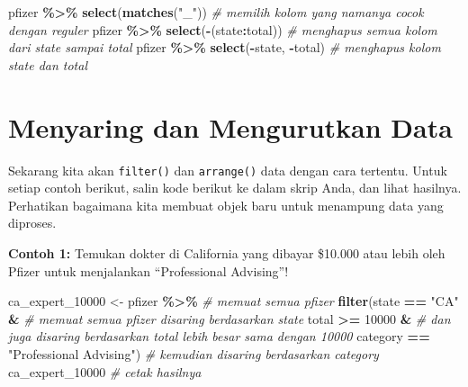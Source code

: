 \documentclass[
]{book}
\newenvironment{Shaded}{\begin{snugshade}}{\end{snugshade}}
\newcommand{\CommentTok}[1]{\textcolor[rgb]{0.56,0.35,0.01}{\textit{#1}}}
\newcommand{\DecValTok}[1]{\textcolor[rgb]{0.00,0.00,0.81}{#1}}
\newcommand{\FunctionTok}[1]{\textcolor[rgb]{0.13,0.29,0.53}{\textbf{#1}}}
\newcommand{\NormalTok}[1]{#1}
\newcommand{\OtherTok}[1]{\textcolor[rgb]{0.56,0.35,0.01}{#1}}
\newcommand{\SpecialCharTok}[1]{\textcolor[rgb]{0.81,0.36,0.00}{\textbf{#1}}}
\newcommand{\StringTok}[1]{\textcolor[rgb]{0.31,0.60,0.02}{#1}}
\begin{document}
\begin{Shaded}
\begin{Highlighting}[]
\NormalTok{pfizer }\SpecialCharTok{\%\textgreater{}\%} \FunctionTok{select}\NormalTok{(}\FunctionTok{matches}\NormalTok{(}\StringTok{"\_"}\NormalTok{))                   }\CommentTok{\# memilih kolom yang namanya cocok dengan reguler}
\NormalTok{pfizer }\SpecialCharTok{\%\textgreater{}\%} \FunctionTok{select}\NormalTok{(}\SpecialCharTok{{-}}\NormalTok{(state}\SpecialCharTok{:}\NormalTok{total))                 }\CommentTok{\# menghapus semua kolom dari \textasciigrave{}state\textasciigrave{} sampai \textasciigrave{}total\textasciigrave{}}
\NormalTok{pfizer }\SpecialCharTok{\%\textgreater{}\%} \FunctionTok{select}\NormalTok{(}\SpecialCharTok{{-}}\NormalTok{state, }\SpecialCharTok{{-}}\NormalTok{total)                 }\CommentTok{\# menghapus kolom \textasciigrave{}state\textasciigrave{} dan \textasciigrave{}total\textasciigrave{}}
\end{Highlighting}
\end{Shaded}

\hypertarget{menyaring-dan-mengurutkan-data}{%
\section{Menyaring dan Mengurutkan Data}\label{menyaring-dan-mengurutkan-data}}

Sekarang kita akan \texttt{filter()} dan \texttt{arrange()} data dengan cara tertentu. Untuk setiap contoh berikut, salin kode berikut ke dalam skrip Anda, dan lihat hasilnya. Perhatikan bagaimana kita membuat objek baru untuk menampung data yang diproses.

\textbf{Contoh 1:} Temukan dokter di California yang dibayar \$10.000 atau lebih oleh Pfizer untuk menjalankan ``Professional Advising''!

\begin{Shaded}
\begin{Highlighting}[]
\NormalTok{ca\_expert\_10000 }\OtherTok{\textless{}{-}}\NormalTok{ pfizer }\SpecialCharTok{\%\textgreater{}\%}                     \CommentTok{\# memuat semua \textasciigrave{}pfizer\textasciigrave{}    }
  \FunctionTok{filter}\NormalTok{(state }\SpecialCharTok{==} \StringTok{"CA"} \SpecialCharTok{\&}                          \CommentTok{\# memuat semua \textasciigrave{}pfizer\textasciigrave{} disaring berdasarkan \textasciigrave{}state\textasciigrave{}}
\NormalTok{         total }\SpecialCharTok{\textgreater{}=} \DecValTok{10000} \SpecialCharTok{\&}                         \CommentTok{\# dan juga disaring berdasarkan \textasciigrave{}total\textasciigrave{} lebih besar sama dengan 10000}
\NormalTok{         category }\SpecialCharTok{==} \StringTok{"Professional Advising"}\NormalTok{)     }\CommentTok{\# kemudian disaring berdasarkan \textasciigrave{}category\textasciigrave{}}
\NormalTok{ca\_expert\_10000                                   }\CommentTok{\# cetak hasilnya}
\end{Highlighting}
\end{Shaded}
\end{document}
